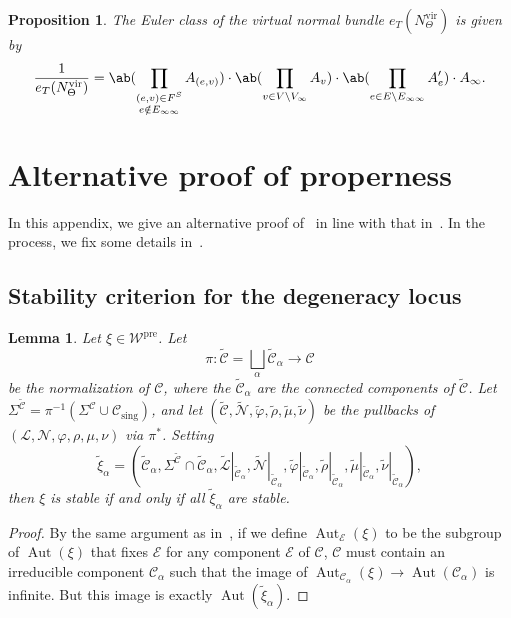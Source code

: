 \documentclass{amsart}
\newtheorem{prop}[thm]{Proposition}
\newtheorem{lem}[thm]{Lemma}
\theoremstyle{definition}
\theoremstyle{remark}
\theoremstyle{plain}
\theoremstyle{definition}
\theoremstyle{remark}
\newcommand{\mc}[1]{\mathcal{#1}}
\newcommand{\mr}[1]{\mathrm{#1}}
\newcommand{\wt}[1]{\widetilde{#1}}
\newcommand{\1}{\mathbf{1}}
\newcommand{\2}{\mathbf{2}}
\newcommand{\3}{\mathbf{3}}
\newcommand{\pre}{\mr{pre}}
\newcommand{\vir}{\mr{vir}}
\DeclareMathOperator{\Aut}{Aut}
\begin{document}
\begin{prop}
    The Euler class of the virtual normal bundle $e_T(N_{\Theta}^{\vir})$ is given by
    \[ \frac{1}{e_T(N_{\Theta}^{\vir})} = \ab( \prod_{\substack{(e,v) \in F^S \\ e \notin E_{\infty\infty}}} A_{(e,v)} ) \cdot \ab( \prod_{v \in V \setminus V_{\infty}} A_v ) \cdot \ab( \prod_{e \in E \setminus E_{\infty\infty}} A'_e ) \cdot A_{\infty}. \]
\end{prop}



\appendix

\section{Alternative proof of properness}
\label{sec:properties}

In this appendix, we give an alternative proof of~ in line with that in~\cite{mspfermat,nmsp}. In the process, we fix some details in~\cite{mspfermat}.

\subsection{Stability criterion for the degeneracy locus}
\label{subsec:stability}

\begin{lem}\label{lem:stability}
    Let $\xi \in \mc{W}^{\pre}$. Let 
    \[\pi \colon \wt{\mc{C}} = \bigsqcup_{\alpha} \wt{\mc{C}}_\alpha \to \mc{C} \] 
    be the normalization of $\mc{C}$, where the $\wt{\mc{C}}_\alpha$ are the connected components of $\wt{\mc{C}}$. Let $\Sigma^{\wt{\mc{C}}} = \pi^{-1}(\Sigma^{\mc{C}} \cup \mc{C}_{\mr{sing}})$, and let $(\wt{\mc{C}}, \wt{\mc{N}}, \wt{\varphi}, \wt{\rho}, \wt{\mu}, \wt{\nu})$ be the pullbacks of $(\mc{L}, \mc{N}, \varphi, \rho,\mu,\nu)$ via $\pi^*$. Setting
    \[ \wt{\xi}_\alpha = (\wt{\mc{C}}_\alpha, \Sigma^{\wt{\mc{C}}} \cap \wt{\mc{C}}_\alpha, \wt{\mc{L}}|_{\wt{\mc{C}}_\alpha},\wt{\mc{N}}|_{\wt{\mc{C}}_\alpha},\wt{\varphi}|_{\wt{\mc{C}}_\alpha},\wt{\rho}|_{\wt{\mc{C}}_\alpha},\wt{\mu}|_{\wt{\mc{C}}_\alpha},\wt{\nu}|_{\wt{\mc{C}}_\alpha}), \]
    then $\xi$ is stable if and only if all $\wt{\xi}_\alpha$ are stable.
\end{lem}

\begin{proof}
  By the same argument as in~\cite[Lemma 3.3]{mspfermat}, if we define $\Aut_{\mc{E}}(\xi)$ to be the subgroup of $\Aut(\xi)$ that fixes $\mc{E}$ for any component $\mc{E}$ of $\mc{C}$, $\mc{C}$ must contain an irreducible component $\mc{C}_\alpha$ such that the image of $\Aut_{\mc{C}_\alpha}(\xi) \to \Aut(\mc{C}_\alpha)$ is infinite. But this image is exactly $\Aut(\wt{\xi}_\alpha)$.
\end{proof}
\end{document}
